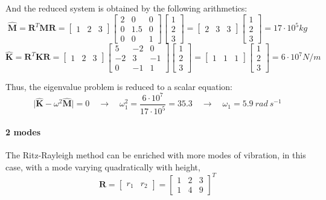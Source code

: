 \begin{Answer}[ref={three_storey_helicopter}]
And the reduced system is obtained by the following arithmetics:
$$
\hat{\mathbf{M}} = \mathbf{R}^T \mathbf{M} \mathbf{R} =
\begin{bmatrix}
    1 & 2 & 3
\end{bmatrix}
\begin{bmatrix}
    2 & 0 & 0 \\
    0 & 1.5 & 0 \\
    0 & 0 & 1
\end{bmatrix}
\begin{bmatrix}
    1 \\ 2 \\ 3
\end{bmatrix} =
\begin{bmatrix}
    2 & 3 & 3
\end{bmatrix}
\begin{bmatrix}
    1 \\ 2 \\ 3
\end{bmatrix} = 17 \cdot 10^5 kg
$$
$$
\hat{\mathbf{K}} = \mathbf{R}^T \mathbf{K} \mathbf{R} =
\begin{bmatrix}
    1 & 2 & 3
\end{bmatrix}
\begin{bmatrix}
    5 & -2 & 0 \\
    -2 & 3 & -1 \\
    0 & -1 & 1
\end{bmatrix}
\begin{bmatrix}
    1 \\ 2 \\ 3
\end{bmatrix} =
\begin{bmatrix}
    1 & 1 & 1
\end{bmatrix}
\begin{bmatrix}
    1 \\ 2 \\ 3
\end{bmatrix} = 6 \cdot 10^7 N/m
$$

Thus, the eigenvalue problem is reduced to a scalar equation:
$$
\vert \hat{\mathbf{K}} - \omega^2\hat{\mathbf{M}} \vert = 0 \quad \rightarrow \quad
\omega^2_1 = \frac{6\cdot10^7}{17\cdot10^5} = 35.3 \quad \rightarrow \quad
\omega_1 = 5.9\ rad\ s^{-1}
$$


\paragraph{2 modes} The Ritz-Rayleigh method can be enriched with more modes of vibration, in this case, with a mode varying quadratically with height,
$$
\mathbf{R} =
\begin{bmatrix}
    r_1 & r_2
\end{bmatrix} =
\begin{bmatrix}
    1 & 2 & 3 \\
    1 & 4 & 9
\end{bmatrix}^T
$$


\end{Answer}
